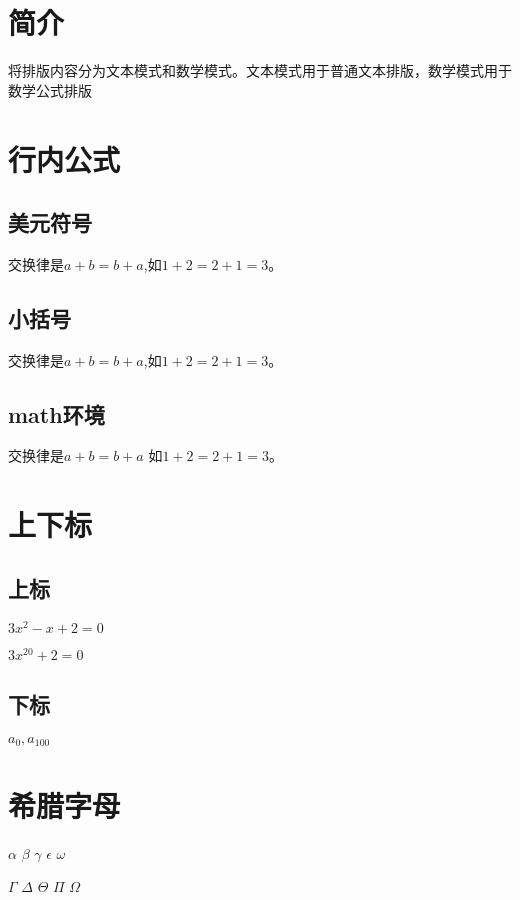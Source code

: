 \documentclass{article}
\begin{document}
	\section{简介}
	\LaTeXe{}将排版内容分为文本模式和数学模式。文本模式用于普通文本排版，数学模式用于数学公式排版
	
	
	\section{行内公式}
	
	\subsection{美元符号}
	交换律是$a+b=b+a$,如$1+2=2+1=3$。
	
	\subsection{小括号}
	交换律是\(a+b=b+a\),如\(1+2=2+1=3\)。
	
	\subsection{math环境}
	交换律是\begin{math}
		a+b=b+a
	\end{math}
	如\begin{math}
		1+2=2+1=3
	\end{math}。
	
	
	\section{上下标}
	\subsection{上标}
	$3x^2-x+2=0$
	
	$3x^{20}+2=0$%
	
	\subsection{下标}
	$a_0,a_{100}$
	
	\section{希腊字母}
	$\alpha$
	$\beta$
	$\gamma$
	$\epsilon$
	$\omega$
	
	$\Gamma$
	$\Delta$
	$\Theta$
	$\Pi$
	$\Omega$
	
\end{document}
